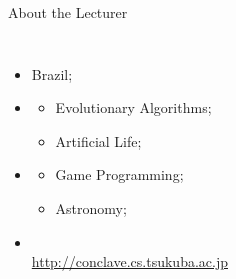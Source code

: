 \documentclass{beamer}
\begin{document}
\begin{CJK}{UTF8}{ipxm}
\begin{frame}{About the Lecturer}
\begin{columns}
{\begin{itemize}
      \item {} Brazil;
      \item {}
      \begin{itemize}
        \item Evolutionary Algorithms;
        \item Artificial Life;
      \end{itemize}
      \item {}
      \begin{itemize}
        \item Game Programming;
        \item Astronomy;
      \end{itemize}
        \medskip

      \item {}\\ {\smaller \url{http://conclave.cs.tsukuba.ac.jp}}
    \end{itemize}
    }
  \end{columns}
\end{frame}


\end{CJK}
\end{document}

